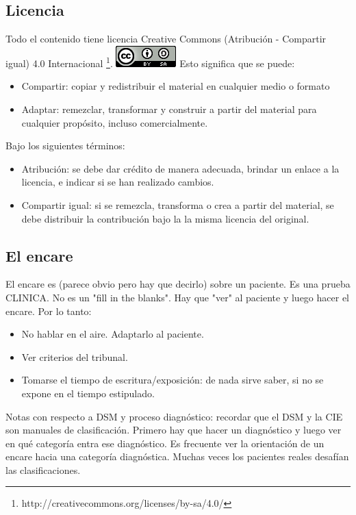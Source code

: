 \documentclass[encares.tex]{subfiles}
\begin{document}
\subsection*{Licencia}
Todo el contenido tiene licencia Creative Commons (Atribución - Compartir igual) 4.0 Internacional \footnote{http://creativecommons.org/licenses/by-sa/4.0/}.
\includegraphics{cc.png}
Esto significa que se puede:
\begin{itemize}
\item Compartir: copiar y redistribuir el material en cualquier medio o formato
\item Adaptar: remezclar, transformar y construir a partir del material para cualquier propósito, incluso comercialmente.
\end{itemize}
Bajo los siguientes términos:
\begin{itemize}
\item Atribución: se debe dar crédito de manera adecuada, brindar un enlace a la licencia, e indicar si se han realizado cambios.
\item Compartir igual: si se remezcla, transforma o crea a partir del material, se debe distribuir la contribución bajo la la misma licencia del original.
\end{itemize}
\subsection*{El encare}
El encare es (parece obvio pero hay que decirlo) sobre un paciente. Es una prueba CLINICA. No es un "fill in the blanks". Hay que "ver" al paciente y luego hacer el encare. Por lo tanto:
\begin{itemize}
\item No hablar en el aire. Adaptarlo al paciente.
\item Ver criterios del tribunal.
\item Tomarse el tiempo de escritura/exposición: de nada sirve saber, si no se expone en el tiempo estipulado.
\end{itemize}
Notas con respecto a DSM y proceso diagnóstico: recordar que el DSM y la CIE son manuales de clasificación. Primero hay que hacer un diagnóstico y luego ver en qué categoría entra ese diagnóstico. Es frecuente ver la orientación de un encare hacia una categoría diagnóstica. Muchas veces los pacientes reales desafían las clasificaciones.
\end{document}
